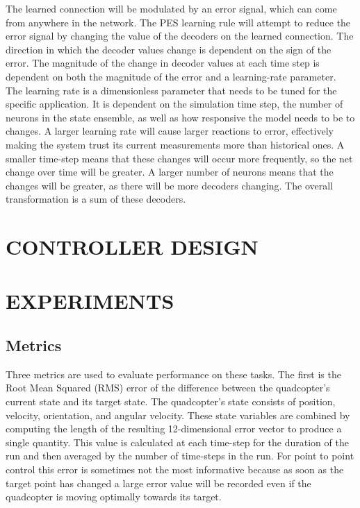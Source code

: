 \documentclass[letterpaper, 10 pt, conference]{ieeeconf}  %
\begin{document}
The learned connection will be modulated by an error signal, which can come from anywhere in the network. 
The PES learning rule will attempt to reduce the error signal by changing the value of the decoders on the learned connection. 
The direction in which the decoder values change is dependent on the sign of the error. 
The magnitude of the change in decoder values at each time step is dependent on both the magnitude of the error and a learning-rate parameter. 
The learning rate is a dimensionless parameter that needs to be tuned for the specific application. 
It is dependent on the simulation time step, the number of neurons in the state ensemble, as well as how responsive the model needs to be to changes. 
A larger learning rate will cause larger reactions to error, effectively making the system trust its current measurements more than historical ones. 
A smaller time-step means that these changes will occur more frequently, so the net change over time will be greater. 
A larger number of neurons means that the changes will be greater, as there will be more decoders changing. The overall transformation is a sum of these decoders. 

\section{CONTROLLER DESIGN}


\section{EXPERIMENTS}


\subsection{Metrics}

Three metrics are used to evaluate performance on these tasks. 
The first is the Root Mean Squared (RMS) error of the difference between the quadcopter's current state and its target state.
The quadcopter's state consists of position, velocity, orientation, and angular velocity.
These state variables are combined by computing the length of the resulting 12-dimensional error vector to produce a single quantity.
This value is calculated at each time-step for the duration of the run and then averaged by the number of time-steps in the run.
For point to point control this error is sometimes not the most informative because as soon as the target point has changed a large error value will be recorded even if the quadcopter is moving optimally towards its target.
\end{document}
